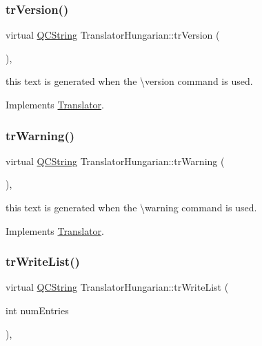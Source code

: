 \subsubsection{\texorpdfstring{trVersion()}{trVersion()}}
{\footnotesize\ttfamily virtual \mbox{\hyperlink{class_q_c_string}{Q\+C\+String}} Translator\+Hungarian\+::tr\+Version (\begin{DoxyParamCaption}{ }\end{DoxyParamCaption})\hspace{0.3cm}{\ttfamily [inline]}, {\ttfamily [virtual]}}

this text is generated when the \textbackslash{}version command is used. 

Implements \mbox{\hyperlink{class_translator}{Translator}}.

\mbox{\label{class_translator_hungarian_a20a300a65309178fdc5d314ee2f81d76}} 
\subsubsection{\texorpdfstring{trWarning()}{trWarning()}}
{\footnotesize\ttfamily virtual \mbox{\hyperlink{class_q_c_string}{Q\+C\+String}} Translator\+Hungarian\+::tr\+Warning (\begin{DoxyParamCaption}{ }\end{DoxyParamCaption})\hspace{0.3cm}{\ttfamily [inline]}, {\ttfamily [virtual]}}

this text is generated when the \textbackslash{}warning command is used. 

Implements \mbox{\hyperlink{class_translator}{Translator}}.

\mbox{\label{class_translator_hungarian_a3374826bb8037e39994404f051f8f552}} 
\subsubsection{\texorpdfstring{trWriteList()}{trWriteList()}}
{\footnotesize\ttfamily virtual \mbox{\hyperlink{class_q_c_string}{Q\+C\+String}} Translator\+Hungarian\+::tr\+Write\+List (\begin{DoxyParamCaption}\item[{int}]{num\+Entries }\end{DoxyParamCaption})\hspace{0.3cm}{\ttfamily [inline]}, {\ttfamily [virtual]}}

